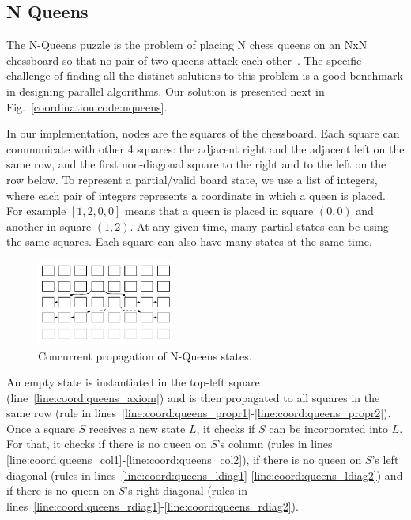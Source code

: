 \subsection{N Queens}

The N-Queens puzzle is the problem of placing N chess queens on an NxN
chessboard so that no pair of two queens attack each
other~\cite{8queens}. The specific challenge of finding all the
distinct solutions to this problem is a good benchmark in designing
parallel algorithms.  Our solution is presented next in
Fig.~\ref{coordination:code:nqueens}.


In our implementation, nodes are the squares of the chessboard. Each
square can communicate with other 4 squares: the adjacent right and
the adjacent left on the same row, and the first non-diagonal square
to the right and to the left on the row below. To represent a
partial/valid board state, we use a list of integers, where each pair
of integers represents a coordinate in which a queen is placed. For
example $[1, 2, 0, 0]$ means that a queen is placed in square $(0, 0)$
and another in square $(1, 2)$. At any given time, many partial states
can be using the same squares. Each square can also have many states
at the same time.

\begin{figure}[ht!]
\includegraphics[width=0.4\textwidth]{figures/coordination/nqueens.pdf}
\caption{Concurrent propagation of N-Queens states.}
\label{coordination:fig:nqueens}
\end{figure}

An empty state is instantiated in the top-left square
(line~\ref{line:coord:queens_axiom}) and is then propagated to all squares in
the same row (rule in
lines~\ref{line:coord:queens_propr1}-\ref{line:coord:queens_propr2}). Once a
square $S$ receives a new state $L$, it checks if $S$ can be incorporated into
$L$. For that, it checks if there is no queen on $S$'s column (rules in lines
\ref{line:coord:queens_col1}-\ref{line:coord:queens_col2}), if there is no queen
on $S$'s left diagonal (rules in
lines~\ref{line:coord:queens_ldiag1}-\ref{line:coord:queens_ldiag2}) and if
there is no queen on $S$'s right diagonal (rules in
lines~\ref{line:coord:queens_rdiag1}-\ref{line:coord:queens_rdiag2}).

